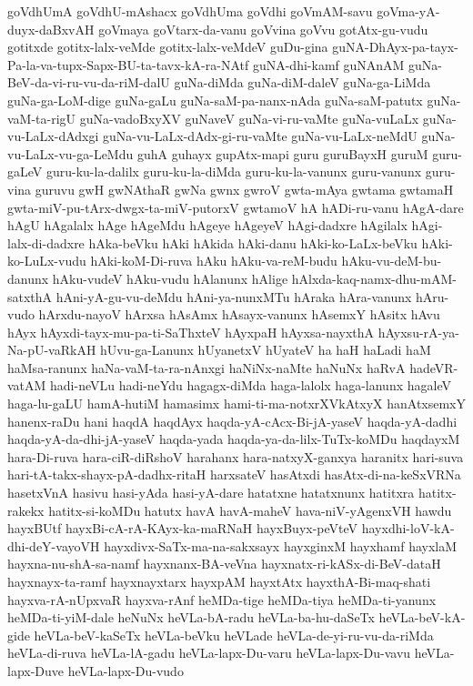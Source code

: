 {goVdhUmA
goVdhU-mAshacx
goVdhUma
goVdhi
goVmAM-savu
goVma-yA-duyx-daBxvAH
goVmaya
goVtarx-da-vanu
goVvina
goVvu
gotAtx-gu-vudu
gotitxde
gotitx-lalx-veMde
gotitx-lalx-veMdeV
guDu-gina
guNA-DhAyx-pa-tayx-Pa-la-va-tupx-Sapx-BU-ta-tavx-kA-ra-NAtf
guNA-dhi-kamf
guNAnAM
guNa-BeV-da-vi-ru-vu-da-riM-dalU
guNa-diMda
guNa-diM-daleV
guNa-ga-LiMda
guNa-ga-LoM-dige
guNa-gaLu
guNa-saM-pa-nanx-nAda
guNa-saM-patutx
guNa-vaM-ta-rigU
guNa-vadoBxyXV
guNaveV
guNa-vi-ru-vaMte
guNa-vuLaLx
guNa-vu-LaLx-dAdxgi
guNa-vu-LaLx-dAdx-gi-ru-vaMte
guNa-vu-LaLx-neMdU
guNa-vu-LaLx-vu-ga-LeMdu
guhA
guhayx
gupAtx-mapi
guru
guruBayxH
guruM
guru-gaLeV
guru-ku-la-dalilx
guru-ku-la-diMda
guru-ku-la-vanunx
guru-vanunx
guru-vina
guruvu
gwH
gwNAthaR
gwNa
gwnx
gwroV
gwta-mAya
gwtama
gwtamaH
gwta-miV-pu-tArx-dwgx-ta-miV-putorxV
gwtamoV
hA
hADi-ru-vanu
hAgA-dare
hAgU
hAgalalx
hAge
hAgeMdu
hAgeye
hAgeyeV
hAgi-dadxre
hAgilalx
hAgi-lalx-di-dadxre
hAka-beVku
hAki
hAkida
hAki-danu
hAki-ko-LaLx-beVku
hAki-ko-LuLx-vudu
hAki-koM-Di-ruva
hAku
hAku-va-reM-budu
hAku-vu-deM-bu-danunx
hAku-vudeV
hAku-vudu
hAlanunx
hAlige
hAlxda-kaq-namx-dhu-mAM-satxthA
hAni-yA-gu-vu-deMdu
hAni-ya-nunxMTu
hAraka
hAra-vanunx
hAru-vudo
hArxdu-nayoV
hArxsa
hAsAmx
hAsayx-vanunx
hAsemxY
hAsitx
hAvu
hAyx
hAyxdi-tayx-mu-pa-ti-SaThxteV
hAyxpaH
hAyxsa-nayxthA
hAyxsu-rA-ya-Na-pU-vaRkAH
hUvu-ga-Lanunx
hUyanetxV
hUyateV
ha
haH
haLadi
haM
haMsa-ranunx
haNa-vaM-ta-ra-nAnxgi
haNiNx-naMte
haNuNx
haRvA
hadeVR-vatAM
hadi-neVLu
hadi-neYdu
hagagx-diMda
haga-lalolx
haga-lanunx
hagaleV
haga-lu-gaLU
hamA-hutiM
hamasimx
hami-ti-ma-notxrXVkAtxyX
hanAtxsemxY
hanenx-raDu
hani
haqdA
haqdAyx
haqda-yA-cAcx-Bi-jA-yaseV
haqda-yA-dadhi
haqda-yA-da-dhi-jA-yaseV
haqda-yada
haqda-ya-da-lilx-TuTx-koMDu
haqdayxM
hara-Di-ruva
hara-ciR-diRshoV
harahanx
hara-natxyX-ganxya
haranitx
hari-suva
hari-tA-takx-shayx-pA-dadhx-ritaH
harxsateV
hasAtxdi
hasAtx-di-na-keSxVRNa
hasetxVnA
hasivu
hasi-yAda
hasi-yA-dare
hatatxne
hatatxnunx
hatitxra
hatitx-rakekx
hatitx-si-koMDu
hatutx
havA
havA-maheV
hava-niV-yAgenxVH
hawdu
hayxBUtf
hayxBi-cA-rA-KAyx-ka-maRNaH
hayxBuyx-peVteV
hayxdhi-loV-kA-dhi-deY-vayoVH
hayxdivx-SaTx-ma-na-sakxsayx
hayxginxM
hayxhamf
hayxlaM
hayxna-nu-shA-sa-namf
hayxnanx-BA-veVna
hayxnatx-ri-kASx-di-BeV-dataH
hayxnayx-ta-ramf
hayxnayxtarx
hayxpAM
hayxtAtx
hayxthA-Bi-maq-shati
hayxva-rA-nUpxvaR
hayxva-rAnf
heMDa-tige
heMDa-tiya
heMDa-ti-yanunx
heMDa-ti-yiM-dale
heNuNx
heVLa-bA-radu
heVLa-ba-hu-daSeTx
heVLa-beV-kA-gide
heVLa-beV-kaSeTx
heVLa-beVku
heVLade
heVLa-de-yi-ru-vu-da-riMda
heVLa-di-ruva
heVLa-lA-gadu
heVLa-lapx-Du-varu
heVLa-lapx-Du-vavu
heVLa-lapx-Duve
heVLa-lapx-Du-vudo
}
